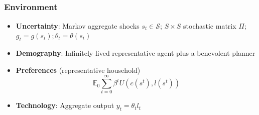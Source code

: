 \documentclass{beamer}
\begin{document}
\subsection{}

\begin{frame}
 \frametitle{Environment}
 \begin{itemize}
 \item \textbf{Uncertainty}: Markov aggregate shocks $s_t\in \mathcal{S}$; $S \times S$ stochastic matrix $\Pi$; $g_t=g(s_t);\theta_t=\theta(s_t)$
  \item \textbf{Demography}: Infinitely lived representative agent plus a benevolent planner
  \item \textbf{Preferences }(representative household)
  \begin{equation*}
\mathbb{E}_{0}\sum_{t=0}^{\infty } \beta^t  U\left(
c(s^t),l(s^t)\right)  \label{utility lifetime}
\end{equation*}%
  \item \textbf{Technology}: Aggregate output  $y_t=\theta_{t} l_{t}$
   \end{itemize}

\end{frame}
\end{document}
